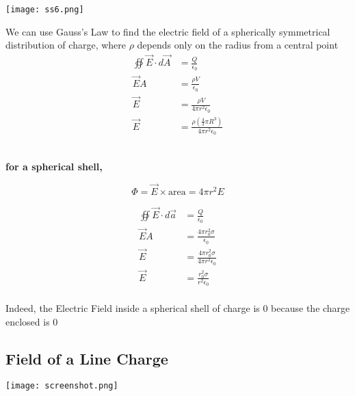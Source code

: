 \documentclass[svgnames]{article}
\begin{document}
\vspace{20px}

\begin{center}
\texttt{[image: ss6.png]}
\end{center}


\vspace{20px}

We can use Gauss's Law to find the electric field of a spherically symmetrical distribution of charge, where $\rho$ depends only on the radius from a central point \\


\begin{align*}
\oiint \vec{E} \cdot d\vec{A} &= \frac{Q}{\epsilon_0} \\
\vec{E} A &= \frac{\rho V}{\epsilon_0} \\ 
\vec{E} &= \frac{\rho V}{4 \pi r^2 \epsilon_0} \\
\vec{E} &= \frac{\rho (\frac{4}{3}\pi R^3)}{4 \pi r^2 \epsilon_0}
\end{align*}\\
\begin{center}


\textbf{for a spherical shell,}
\end{center}

\[ \Phi = \vec{E} \times \text{area} = 4\pi r^2 E \] 

\begin{align*} 
\oiint \vec{E} \cdot d\vec{a} &= \frac{Q}{\epsilon_0} \\
\vec{E}A &= \frac{4\pi r_0^2 \sigma}{\epsilon_0} \\ 
\vec{E} &= \frac{4\pi r_0^2 \sigma}{4\pi r^2 \epsilon_0} \\ 
\vec{E} &= \frac{r_0^2 \sigma}{r^2 \epsilon_0}
\end{align*} \\


Indeed, the Electric Field inside a spherical shell of charge is 0 because the charge enclosed is 0 \\

\subsection{Field of a Line Charge} 

\vspace{20px} 

\begin{center}
\texttt{[image: screenshot.png]}
\end{center} 
\end{document}
